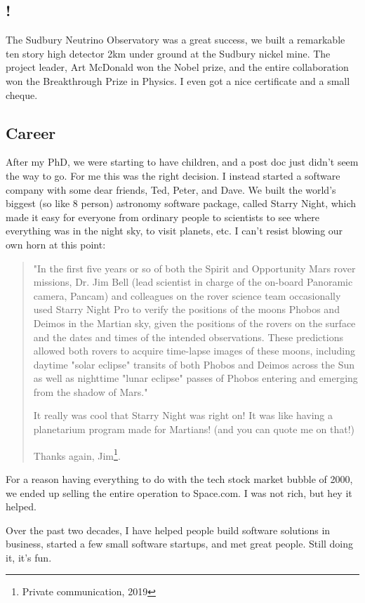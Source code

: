 \documentclass[../rzero]{subfiles}
\begin{document}
\subsection*{!}
The Sudbury Neutrino Observatory was a great success, we built a remarkable ten story high detector 2km under ground at the Sudbury nickel mine. The project leader, Art McDonald won the Nobel prize, and the entire collaboration won the Breakthrough Prize in Physics. I even got a nice certificate and a small cheque.

\subsection*{Career}
After my PhD, we were starting to have children, and a post doc just didn't seem the way to go. For me this was the right decision. I instead started a software company with some dear friends, Ted, Peter, and Dave. We built the world's biggest (so like 8 person) astronomy software package, called Starry Night, which made it easy for everyone from ordinary people to scientists to see where everything was in the night sky, to visit planets, etc. I can't resist blowing our own horn at this point:
\begin{quotation}
	"In the first five years or so of both the Spirit and Opportunity Mars rover missions, Dr. Jim Bell (lead scientist in charge of the on-board Panoramic camera, Pancam) and colleagues on the rover science team occasionally used Starry Night Pro to verify the positions of the moons Phobos and Deimos in the Martian sky, given the positions of the rovers on the surface and the dates and times of the intended observations. These predictions allowed both rovers to acquire time-lapse images of these moons, including daytime "solar eclipse" transits of both Phobos and Deimos across the Sun as well as nighttime "lunar eclipse" passes of Phobos entering and emerging from the shadow of Mars."
 
It really was cool that Starry Night was right on!  It was like having a planetarium program made for Martians!   (and you can quote me on that!)
 
Thanks again,
Jim\footnote{Private communication, 2019}.
\end{quotation} 

For a reason having everything to do with the tech stock market bubble of 2000, we ended up selling the entire operation to Space.com. I was not rich, but hey it helped.

Over the past two decades, I have helped people build software solutions in business, started a few small software startups, and met great people. Still doing it, it's fun. 
\end{document}
